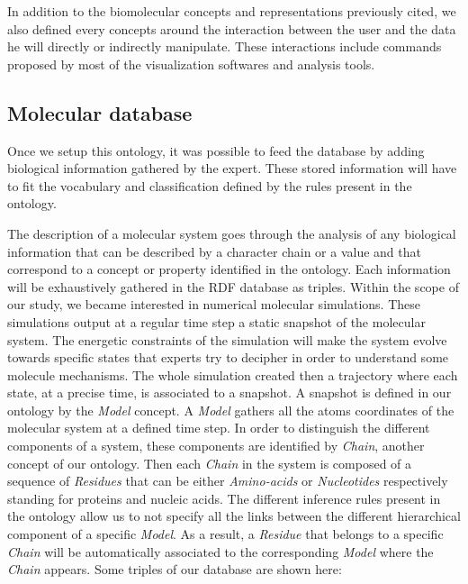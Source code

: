 \documentclass{vgtc}                          %
\begin{document}
In addition to the biomolecular concepts and representations previously cited, we also defined every concepts around the interaction between the user and the data he will directly or indirectly manipulate. These interactions include commands proposed by most of the visualization softwares and analysis tools.

\subsection{Molecular database}

Once we setup this ontology, it was possible to feed the database by adding biological information gathered by the expert. These stored information will have to fit the vocabulary and classification defined by the rules present in the ontology.

The description of a molecular system goes through the analysis of any biological information that can be described by a character chain or a value and that correspond to a concept or property identified in the ontology. Each information will be exhaustively gathered in the RDF database as triples. Within the scope of our study, we became interested in numerical molecular simulations. These simulations output at a regular time step a static snapshot of the molecular system. The energetic constraints of the simulation will make the system evolve towards specific states that experts try to decipher in order to understand some molecule mechanisms. The whole simulation created then a trajectory where each state, at a precise time, is associated to a snapshot. A snapshot is defined in our ontology by the \textit{Model} concept. A \textit{Model} gathers all the atoms coordinates of the molecular system at a defined time step. In order to distinguish the different components of a system, these components are identified by \textit{Chain}, another concept of our ontology. Then each \textit{Chain} in the system is composed of a sequence of \textit{Residues} that can be either \textit{Amino-acids} or \textit{Nucleotides} respectively standing for proteins and nucleic acids. The different inference rules present in the ontology allow us to not specify all the links between the different hierarchical component of a specific \textit{Model}. As a result, a \textit{Residue} that belongs to a specific \textit{Chain} will be automatically associated to the corresponding \textit{Model} where the \textit{Chain} appears.
Some triples of our database are shown here:
\end{document}
